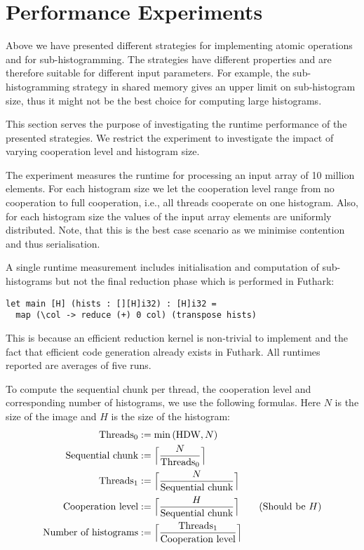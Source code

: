 \section{Performance Experiments}
\label{sec:performance_experiments}

Above we have presented different strategies for 
implementing atomic operations and for sub-histogramming.
The strategies have different properties and are therefore
suitable for different input parameters. For example, the
sub-histogramming strategy in shared memory gives an upper
limit on sub-histogram size, thus it might not be the best
choice for computing large histograms. 

This section serves the purpose of investigating the runtime
performance of the presented strategies. We restrict the
experiment to investigate the impact of varying cooperation
level and histogram size.

The experiment measures the runtime for processing an input
array of 10 million elements. For each histogram size we let
the cooperation level range from no cooperation to full
cooperation, i.e., all threads cooperate on one histogram.
Also, for each histogram size the values of the input array
elements are uniformly distributed. Note, that this is the
best case scenario as we minimise contention and thus
serialisation.

A single runtime measurement includes initialisation and
computation of sub-histograms but not the final reduction
phase which is performed in Futhark:
%
\begin{verbatim}
let main [H] (hists : [][H]i32) : [H]i32 =
  map (\col -> reduce (+) 0 col) (transpose hists)
\end{verbatim}
%
This is because an efficient reduction kernel is non-trivial
to implement and the fact that efficient code generation
already exists in Futhark. All runtimes reported are
averages of five runs.

To compute the sequential chunk per thread, the cooperation
level and corresponding number of histograms, we use the
following formulas. Here $N$ is the size of the image and
$H$ is the size of the histogram:
%
\begin{align}
  \text{Threads}_0 &:=
  \operatorname{min}\left( \text{HDW}, N \right) \\
  \text{Sequential chunk} &:=
  \Bigl\lceil \frac{N}{\text{Threads}_0} \Bigr\rceil \\
  \text{Threads}_1 &:=
  \Bigl\lceil \frac{N}{\text{Sequential chunk}} \Bigr\rceil \\
  \text{Cooperation level} &:=
  \Bigl\lceil \frac{H}{\text{Sequential chunk}} \Bigr\rceil
  \qquad (\text{Should be } H) \\
  \text{Number of histograms} &:=
  \Bigl\lceil \frac{\text{Threads}_1}{\text{Cooperation level}} \Bigr\rceil
\end{align}
%

